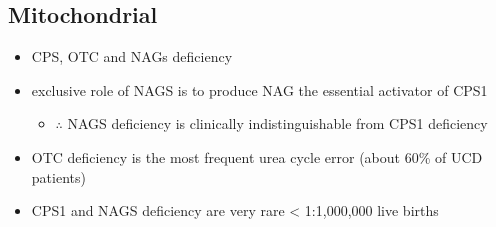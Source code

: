 \documentclass{scrartcl}
\begin{document}
\subsection{Mitochondrial}
\label{sec:orgd4b54b0}
\begin{itemize}
\item CPS, OTC and NAGs deficiency
\item exclusive role of NAGS is to produce NAG the essential activator of CPS1
\begin{itemize}
\item \(\therefore\) NAGS deficiency is clinically indistinguishable from
CPS1 deficiency
\end{itemize}
\item OTC deficiency is the most frequent urea cycle error (about 60\% of UCD patients)
\item CPS1 and NAGS deficiency are very rare \textless{} 1:1,000,000 live births
\end{itemize}
\end{document}
